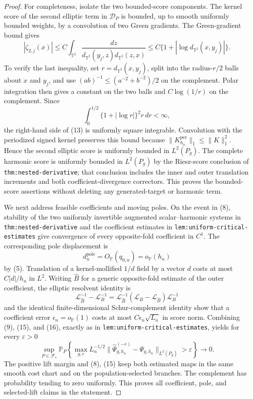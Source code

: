\documentclass{article}
\begin{document}
\begin{proof}
For completeness, isolate the two bounded-score components.  The kernel score of the second elliptic term in \(\mathcal D_P\) is bounded, up to smooth uniformly bounded weights, by a convolution of two Green gradients.  The Green-gradient bound gives
\[
 |\zeta_{2,j}(x)|
 \leq C\int_{\mathbb T^2}
 \frac{dz}{d_{\mathbb T^2}(y_j,z)d_{\mathbb T^2}(z,x)}
 \leq C\{1+|\log d_{\mathbb T^2}(x,y_j)|\}.
\tag{13}
\]
To verify the last inequality, set \(r=d_{\mathbb T^2}(x,y_j)\), split into the radius-\(r/2\) balls about \(x\) and \(y_j\), and use
\((ab)^{-1}\leq(a^{-2}+b^{-2})/2\) on the complement.  Polar integration then gives a constant on the two balls and \(C\log(1/r)\) on the complement.  Since
\[
 \int_0^{1/2}\{1+|\log r|\}^2r\,dr<\infty,
\tag{14}
\]
the right-hand side of (13) is uniformly square integrable.  Convolution with the periodized signed kernel preserves this bound because
\(\lVert K_{h_n}^{\mathrm{per}}\rVert_1\leq\lVert K\rVert_1^2\).  Hence the second elliptic score is uniformly bounded in \(L^2(P_g)\).  The complete harmonic score is uniformly bounded in \(L^2(P_g)\) by the Riesz-score conclusion of
\texttt{thm:nested-derivative}; that conclusion includes the inner and outer translation increments and both coefficient-divergence correctors.  This proves the bounded-score assertions without deleting any generated-target or harmonic term.

We next address feasible coefficients and moving poles.  On the event in (8), stability of the two uniformly invertible augmented scalar--harmonic systems in
\texttt{thm:nested-derivative} and the coefficient estimates in
\texttt{lem:uniform-critical-estimates} give convergence of every opposite-fold coefficient in \(C^1\).  The corresponding pole displacement is
\[
 d_n^{\mathrm{pole}}=O_{\mathbb P}(q_{0,n})=o_{\mathbb P}(h_n)
\tag{15}
\]
by (5).  Translation of a kernel-mollified \(1/d\) field by a vector \(d\) costs at most \(C|d|/h_n\) in \(L^2\).  Writing \(\widehat B\) for a generic opposite-fold estimate of the outer coefficient, the elliptic resolvent identity is
\[
 \mathcal L_{\widehat B}^{-1}-\mathcal L_B^{-1}
 =\mathcal L_{\widehat B}^{-1}
   (\mathcal L_B-\mathcal L_{\widehat B})\mathcal L_B^{-1}
\tag{16}
\]
and the identical finite-dimensional Schur-complement identity show that a coefficient error \(\epsilon_n=o_{\mathbb P}(1)\) costs at most
\(C\epsilon_n\sqrt{L_n}\) in score norm.  Combining (9), (15), and (16), exactly as in
\texttt{lem:uniform-critical-estimates}, yields for every \(\varepsilon>0\)
\[
 \sup_{P\in\mathcal F_s}\mathbb P_P\!\left\{
 \max_{g,r}L_n^{-1/2}
 \lVert\widehat\Psi_{g,h_n}^{(-r)}-\Psi_{g,h_n}\rVert_{L^2(P_g)}
 >\varepsilon\right\}\longrightarrow0.
\tag{17}
\]
The positive lift margin and (8), (15) keep both estimated maps in the same smooth cost chart and on the population-selected branches.  The complement has probability tending to zero uniformly.  This proves all coefficient, pole, and selected-lift claims in the statement.


\end{proof}
\end{document}
